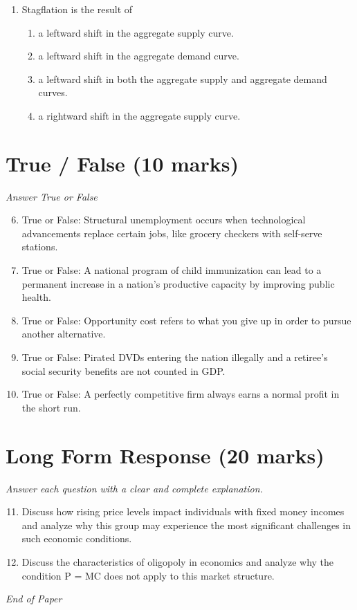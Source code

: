 \documentclass[12pt]{article}
\begin{document}
\begin{enumerate}[label=\arabic*.]
\begin{enumerate}[label=(\alph*)]
    \item Increases aggregate demand which increases real GDP and increases employment.
    \item Increases unemployment but low prices negate this effect.
    \item It keeps interest rates high which attracts foreign investment.
\end{enumerate}
\item Stagflation is the result of
\begin{enumerate}[label=(\alph*)]
    \item a leftward shift in the aggregate supply curve.
    \item a leftward shift in the aggregate demand curve.
    \item a leftward shift in both the aggregate supply and aggregate demand curves.
    \item a rightward shift in the aggregate supply curve.
\end{enumerate}
\end{enumerate}

\section*{True / False (10 marks)}
\textit{Answer True or False}
\begin{enumerate}[label=\arabic*.]
\setcounter{enumi}{5}
\item True or False: Structural unemployment occurs when technological advancements replace certain jobs, like grocery checkers with self-serve stations.
\item True or False: A national program of child immunization can lead to a permanent increase in a nation's productive capacity by improving public health.
\item True or False: Opportunity cost refers to what you give up in order to pursue another alternative.
\item True or False: Pirated DVDs entering the nation illegally and a retiree's social security benefits are not counted in GDP.
\item True or False: A perfectly competitive firm always earns a normal profit in the short run.
\end{enumerate}

\section*{Long Form Response (20 marks)}
\textit{Answer each question with a clear and complete explanation.}
\begin{enumerate}[label=\arabic*.]
\setcounter{enumi}{10}
\item Discuss how rising price levels impact individuals with fixed money incomes and analyze why this group may experience the most significant challenges in such economic conditions.
\item Discuss the characteristics of oligopoly in economics and analyze why the condition P = MC does not apply to this market structure.
\end{enumerate}

\vfill
\noindent\textit{End of Paper}
\end{document}
